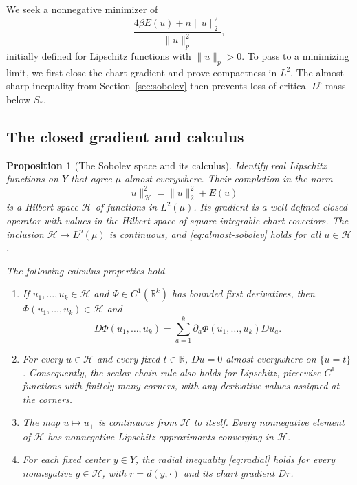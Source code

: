 \documentclass[11pt]{article}
\numberwithin{equation}{section}
\newtheorem{proposition}[theorem]{Proposition}
\theoremstyle{definition}
\theoremstyle{remark}
\begin{document}
We seek a nonnegative minimizer of
\[
 \frac{4\beta E(u)+n\|u\|_2^2}{\|u\|_p^2},
\]
initially defined for Lipschitz functions with $\|u\|_p>0$.
To pass to a minimizing limit, we first close the chart gradient and
prove compactness in $L^2$. The almost sharp inequality from
Section~\ref{sec:sobolev} then prevents loss of critical $L^p$ mass
below $S_*$.

\subsection{The closed gradient and calculus}

\begin{proposition}[The Sobolev space and its calculus]
\label{prop:sobolev-space}
Identify real Lipschitz functions on $Y$ that agree $\mu$-almost
everywhere. Their completion in the norm
\[
 \|u\|_{\mathcal H}^2=\|u\|_2^2+E(u)
\]
is a Hilbert space $\mathcal H$ of functions in $L^2(\mu)$.  Its gradient is
a well-defined closed operator with values in the Hilbert space of
square-integrable chart covectors.  The inclusion
$\mathcal H\longrightarrow L^p(\mu)$ is continuous, and
\eqref{eq:almost-sobolev} holds for all $u\in\mathcal H$.

The following calculus properties hold.
\begin{enumerate}[label=\textup{(\roman*)}]
 \item If $u_1,\ldots,u_k\in\mathcal H$ and
 $\Phi\in C^1(\mathbb R^k)$ has bounded first derivatives, then
 $\Phi(u_1,\ldots,u_k)\in\mathcal H$ and
 \[
 D\Phi(u_1,\ldots,u_k)
 =\sum_{a=1}^k\partial_a\Phi(u_1,\ldots,u_k)Du_a.
 \]
 \item For every $u\in\mathcal H$ and every fixed $t\in\mathbb R$,
 $Du=0$ almost everywhere on $\{u=t\}$.  Consequently, the scalar
 chain rule also holds for Lipschitz, piecewise $C^1$ functions with
 finitely many corners, with any derivative values assigned at the
 corners.
 \item The map $u\mapsto u_+$ is continuous from $\mathcal H$ to itself.
 Every nonnegative element of $\mathcal H$ has nonnegative Lipschitz
 approximants converging in $\mathcal H$.
 \item For each fixed center $y\in Y$, the radial inequality
 \eqref{eq:radial} holds for every nonnegative $g\in\mathcal H$, with
 $r=d(y,\cdot)$ and its chart gradient $Dr$.
\end{enumerate}
\end{proposition}
\end{document}
